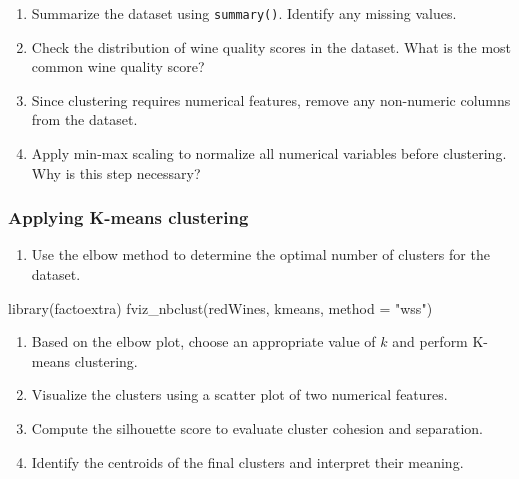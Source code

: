 \documentclass[
  11pt,
]{book}
\makeatletter
\newenvironment{Shaded}{}{}
\newcommand{\AttributeTok}[1]{#1}
\newcommand{\FunctionTok}[1]{#1}
\newcommand{\NormalTok}[1]{#1}
\newcommand{\StringTok}[1]{\textcolor[rgb]{0.39,0.39,0.39}{#1}}
\providecommand{\tightlist}{%
  \setlength{\itemsep}{0pt}\setlength{\parskip}{0pt}}
\newenvironment{kframe}{%
\medskip{}
\setlength{\fboxsep}{.8em}
 \def\at@end@of@kframe{}%
 \ifinner\ifhmode%
  \def\at@end@of@kframe{\end{minipage}}%
  \begin{minipage}{\columnwidth}%
 \fi\fi%
 \def\FrameCommand##1{\hskip\@totalleftmargin \hskip-\fboxsep
 \colorbox{shadecolor}{##1}\hskip-\fboxsep
     \hskip-\linewidth \hskip-\@totalleftmargin \hskip\columnwidth}%
 \MakeFramed {\advance\hsize-\width
   \@totalleftmargin\z@ \linewidth\hsize
   \@setminipage}}%
 {\par\unskip\endMakeFramed%
 \at@end@of@kframe}
\renewenvironment{Shaded}{\begin{kframe}}{\end{kframe}}
\theoremstyle{definition}
\theoremstyle{definition}
\theoremstyle{definition}
\theoremstyle{definition}
\theoremstyle{remark}
\makeatother
\begin{document}
\begin{enumerate}
\def\labelenumi{\arabic{enumi}.}
\setcounter{enumi}{21}
\tightlist
\item
  Summarize the dataset using \texttt{summary()}. Identify any missing values.\\
\item
  Check the distribution of wine quality scores in the dataset. What is the most common wine quality score?\\
\item
  Since clustering requires numerical features, remove any non-numeric columns from the dataset.\\
\item
  Apply min-max scaling to normalize all numerical variables before clustering. Why is this step necessary?
\end{enumerate}

\subsubsection*{Applying K-means clustering}\label{applying-k-means-clustering-1}


\begin{enumerate}
\def\labelenumi{\arabic{enumi}.}
\setcounter{enumi}{25}
\tightlist
\item
  Use the elbow method to determine the optimal number of clusters for the dataset.\\
\end{enumerate}

\begin{Shaded}
\begin{Highlighting}[]
\FunctionTok{library}\NormalTok{(factoextra)}
\FunctionTok{fviz\_nbclust}\NormalTok{(redWines, kmeans, }\AttributeTok{method =} \StringTok{"wss"}\NormalTok{)}
\end{Highlighting}
\end{Shaded}

\begin{enumerate}
\def\labelenumi{\arabic{enumi}.}
\setcounter{enumi}{26}
\tightlist
\item
  Based on the elbow plot, choose an appropriate value of \(k\) and perform K-means clustering.\\
\item
  Visualize the clusters using a scatter plot of two numerical features.\\
\item
  Compute the silhouette score to evaluate cluster cohesion and separation.\\
\item
  Identify the centroids of the final clusters and interpret their meaning.
\end{enumerate}
\end{document}

